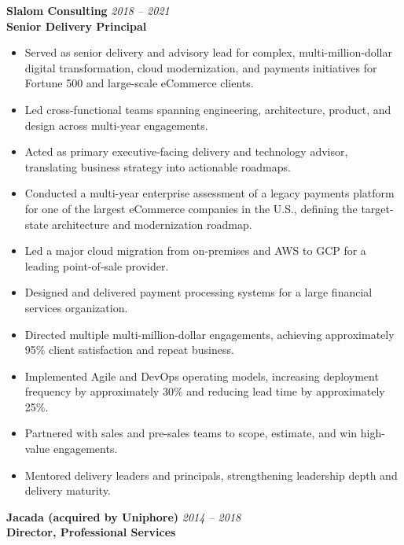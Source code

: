 \documentclass[11pt]{article}
\begin{document}
\vspace{6pt}

\pagebreak

\textbf{Slalom Consulting} \hfill \textit{2018 -- 2021} \\
\textbf{Senior Delivery Principal}

\begin{itemize}
  \item Served as senior delivery and advisory lead for complex, multi-million-dollar digital transformation, cloud modernization, and payments initiatives for Fortune 500 and large-scale eCommerce clients.
  \item Led cross-functional teams spanning engineering, architecture, product, and design across multi-year engagements.
  \item Acted as primary executive-facing delivery and technology advisor, translating business strategy into actionable roadmaps.
  \item Conducted a multi-year enterprise assessment of a legacy payments platform for one of the largest eCommerce companies in the U.S., defining the target-state architecture and modernization roadmap.
  \item Led a major cloud migration from on-premises and AWS to GCP for a leading point-of-sale provider.
  \item Designed and delivered payment processing systems for a large financial services organization.
  \item Directed multiple multi-million-dollar engagements, achieving approximately 95\% client satisfaction and repeat business.
  \item Implemented Agile and DevOps operating models, increasing deployment frequency by approximately 30\% and reducing lead time by approximately 25\%.
  \item Partnered with sales and pre-sales teams to scope, estimate, and win high-value engagements.
  \item Mentored delivery leaders and principals, strengthening leadership depth and delivery maturity.
\end{itemize}

\vspace{6pt}

\textbf{Jacada (acquired by Uniphore)} \hfill \textit{2014 -- 2018} \\
\textbf{Director, Professional Services}
\end{document}
